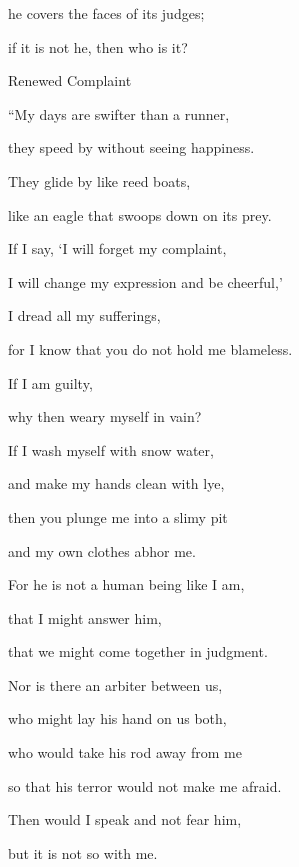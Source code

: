 {\par }{\Q he covers
the faces
of its judges;
\par }{\Q if
it is not
he, then
who is it?
\par }{\SH Renewed Complaint
\par }{\Q {}“My days
are swifter
than
a runner,
\par }{\Q they speed
by without
seeing
happiness.
\par }{\Q {}They glide
by like
reed
boats,
\par }{\Q like an eagle
that swoops
down on
its prey.
\par }{\Q {}If
I say, ‘I will forget
my complaint,
\par }{\Q I will change my expression
and be cheerful,’
\par }{\Q {}I dread
all
my sufferings,
\par }{\Q for I know
that
you do not
hold me blameless.
\par }{\Q {}If I am
guilty,
\par }{\Q why
then weary
myself in vain?
\par }{\Q {}If
I wash
myself with snow water,
\par }{\Q and make my hands
clean with lye,
\par }{\Q {}then
you plunge
me into a slimy pit
\par }{\Q and my own clothes
abhor me.
\par }{\Q {}For
he is not
a human
being like
I am,
\par }{\Q that I might answer
him,
\par }{\Q that we might come
together
in judgment.
\par }{\Q {}Nor is there
an arbiter
between us,
\par }{\Q who
might lay
his hand
on
us both,
\par }{\Q {}who would
take his rod
away from me
\par }{\Q so that his terror
would not
make me afraid.
\par }{\Q {}Then would I speak
and not
fear
him,
\par }{\Q but
it is not
so
with me.


\par }

